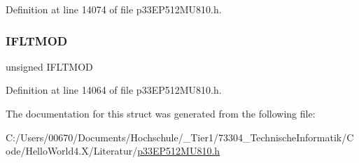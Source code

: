 Definition at line 14074 of file p33\+E\+P512\+M\+U810.\+h.

\mbox{\label{structtag_f_c_l_c_o_n1_b_i_t_s_a4573eed251d96a98a6b5ba1c7cc30451}} 
\subsubsection{\texorpdfstring{I\+F\+L\+T\+M\+OD}{IFLTMOD}}
{\footnotesize\ttfamily unsigned I\+F\+L\+T\+M\+OD}



Definition at line 14064 of file p33\+E\+P512\+M\+U810.\+h.



The documentation for this struct was generated from the following file\+:\begin{DoxyCompactItemize}
\item 
C\+:/\+Users/00670/\+Documents/\+Hochschule/\+\_\+\+Tier1/73304\+\_\+\+Technische\+Informatik/\+Code/\+Hello\+World4.\+X/\+Literatur/\hyperlink{p33_e_p512_m_u810_8h}{p33\+E\+P512\+M\+U810.\+h}\end{DoxyCompactItemize}
